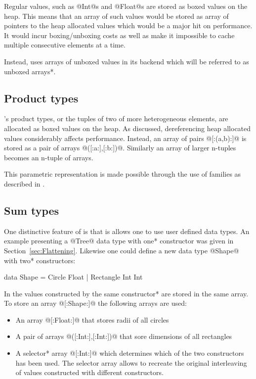 \documentclass[preamble.tex]{subfiles}
\begin{document}
Regular \Haskell values, such as @Int@s and @Float@s are stored as boxed values on the heap. This means that an array of such values would be stored as array of pointers to the heap allocated values which would be a major hit on performance. It would incur boxing/unboxing costs as well as make it impossible to cache multiple consecutive elements at a time.

Instead, \DPH uses arrays of unboxed values in its backend which will be referred to as \*unboxed arrays*.


\subsection{Product types}

\Haskell's product types, or the tuples of two of more heterogeneous elements, are allocated as boxed values on the heap. As discussed, dereferencing heap allocated values considerably affects performance. Instead, an array of pairs @[:(a,b):]@ is stored as a pair of arrays @([:a:],[:b:])@. Similarly an array of larger n-tuples becomes an n-tuple of arrays.

This parametric representation is made possible through the use of families as described in \cite{InstantGenerics, AssocTypes}.


\subsection{Sum types}

One distinctive feature of \DPH is that is allows one to use user defined data types. An example presenting a @Tree@ data type with \*one* constructor was given in Section~\ref{sec:Flattening}. Likewise one could define a new data type @Shape@ with \*two* constructors:

\begin{hscode}
data Shape = Circle Float
           | Rectangle Int Int
\end{hscode}

In \DPH the values constructed by the \*same constructor* are stored in the same array. To store an array @[:Shape:]@ the following arrays are used:
\begin{itemize}
\item An array @[:Float:]@ that stores radii of all circles
\item A pair of arrays @([:Int:],[:Int:])@ that sore dimensions of all rectangles
\item A \*selector* array @[:Int:]@ which determines which of the two constructors has been used. The selector array allows to recreate the original interleaving of values constructed with different constructors.
\end{itemize}
\end{document}
